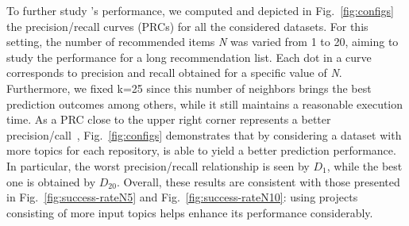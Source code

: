 


To further study \TF's performance, we computed and depicted in Fig.~\ref{fig:configs} the precision/recall curves (PRCs) for all the considered datasets. 
For this setting, the number of recommended items \emph{N} was varied from 1 to 20, aiming to study the performance for a long recommendation list. Each dot in a curve corresponds to precision and recall obtained for a specific value of \emph{N}. Furthermore, we fixed k=25 since this number of neighbors brings the best prediction outcomes among others, while it still maintains a reasonable execution time. As a PRC close to the upper right corner represents a better precision/call~\cite{NGUYEN2020110460}, Fig.~\ref{fig:configs} demonstrates that by considering a dataset with more topics for each repository, \TFa is able to yield a better prediction performance. In particular, the worst precision/recall relationship is seen by $D_{1}$, while the best one is obtained by $D_{20}$. Overall, these results are consistent with those presented in Fig.~\ref{fig:success-rateN5} and Fig.~\ref{fig:success-rateN10}: using projects consisting of more input topics helps \TFa enhance its performance considerably.


